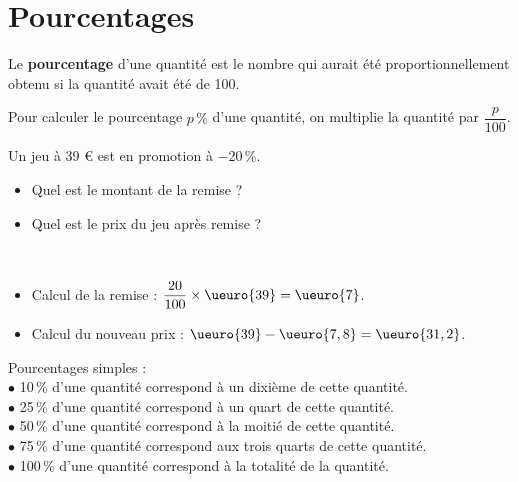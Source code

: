 \cours 

\section{Pourcentages}

\begin{definition}
   Le {\bf pourcentage} d'une quantité est le nombre qui aurait été proportionnellement obtenu si la quantité avait été de 100.
\end{definition}

\begin{propriete}
   Pour calculer le pourcentage $p\,\%$ d'une quantité, on multiplie la quantité par $\dfrac{p}{100}$.
\end{propriete}

\begin{exemple}
   Un jeu à 39 \euro{} est en promotion à $-$20\,\%. 
   \begin{itemize}
      \item Quel est le montant de la remise ?
      \item Quel est le prix du jeu après remise ?
   \end{itemize}
   \correction
   \ \\ [-8mm]
   \begin{itemize}
      \item Calcul de la remise : $\dfrac{20}{100}\times\ueuro{39}=\ueuro{7}$. \medskip
      \item Calcul du nouveau prix : $\ueuro{39}-\ueuro{7,8} =\ueuro{31,2}$.
   \end{itemize}
\end{exemple}

\bigskip

Pourcentages simples : \\
$\bullet$ 10\,\% d'une quantité correspond à un dixième de cette quantité. \\
$\bullet$ 25\,\% d'une quantité correspond à un quart de cette quantité. \\
$\bullet$ 50\,\% d'une quantité correspond à la moitié de cette quantité. \\
$\bullet$ 75\,\% d'une quantité correspond aux trois quarts de cette quantité. \\
$\bullet$ 100\,\% d'une quantité correspond à la totalité de la quantité. \\

